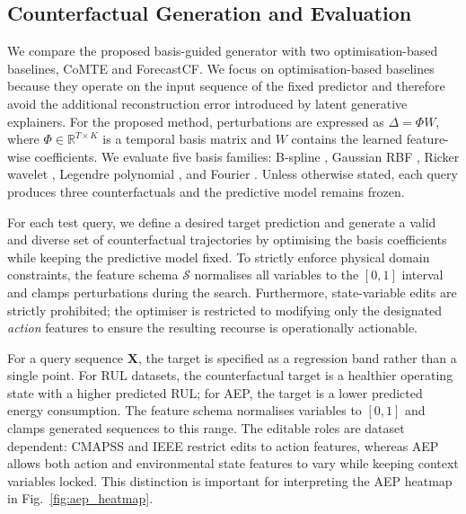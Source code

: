 \documentclass[runningheads]{llncs}
\begin{document}
	
	\subsection{Counterfactual Generation and Evaluation}
	\label{subsec:cf_setup}
	We compare the proposed basis-guided generator with two optimisation-based baselines, CoMTE and ForecastCF. We focus on optimisation-based baselines because they operate on the input sequence of the fixed predictor and therefore avoid the additional reconstruction error introduced by latent generative explainers. For the proposed method, perturbations are expressed as $\Delta = \Phi W$, where $\Phi \in \mathbb{R}^{T \times K}$ is a temporal basis matrix and $W$ contains the learned feature-wise coefficients. We evaluate five basis families: B-spline \cite{deBoor1978}, Gaussian RBF \cite{broomhead1988multivariable}, Ricker wavelet \cite{Ricker1953}, Legendre polynomial \cite{abramowitz1964handbook}, and Fourier \cite{konidaris2011value}. Unless otherwise stated, each query produces three counterfactuals and the predictive model remains frozen.
	
	For each test query, we define a desired target prediction and generate a valid and diverse set of counterfactual trajectories by optimising the basis coefficients while keeping the predictive model fixed. To strictly enforce physical domain constraints, the feature schema $\mathcal{S}$ normalises all variables to the $[0, 1]$ interval and clamps perturbations during the search. Furthermore, state-variable edits are strictly prohibited; the optimiser is restricted to modifying only the designated \textit{action} features to ensure the resulting recourse is operationally actionable. 
	
	For a query sequence $\mathbf{X}$, the target is specified as a regression band rather than a single point. For RUL datasets, the counterfactual target is a healthier operating state with a higher predicted RUL; for AEP, the target is a lower predicted energy consumption. The feature schema normalises variables to $[0,1]$ and clamps generated sequences to this range. The editable roles are dataset dependent: CMAPSS and IEEE restrict edits to action features, whereas AEP allows both action and environmental state features to vary while keeping context variables locked. This distinction is important for interpreting the AEP heatmap in Fig.~\ref{fig:aep_heatmap}.
	
\end{document}

